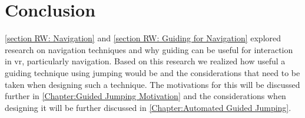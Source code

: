 \section{Conclusion}
\label{section RW: Conclusion}
\cref{section RW: Navigation} and \cref{section RW: Guiding for Navigation} explored research on navigation techniques and why guiding can be useful for interaction in \acrshort{vr}, particularly navigation. Based on this research we realized how useful a guiding technique using jumping would be and the considerations that need to be taken when designing such a technique. The motivations for this will be discussed further in \cref{Chapter:Guided Jumping Motivation} and the considerations when designing it will be further discussed in \cref{Chapter:Automated Guided Jumping}.